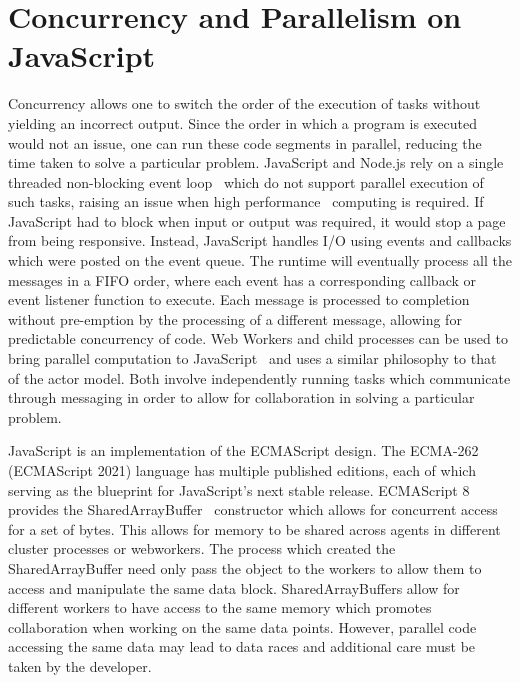 \documentclass[12pt, a4paper]{report}
\theoremstyle{definition}
\theoremstyle{definition}%
\theoremstyle{definition}%
\theoremstyle{definition}%
\theoremstyle{definition}%
\theoremstyle{definition}%
\begin{document}
\section{Concurrency and Parallelism on JavaScript}
Concurrency allows one to switch the order of the execution of tasks without yielding an incorrect output. Since the order in which a program is executed would not an issue, one can run these code segments in parallel, reducing the time taken to solve a particular problem. JavaScript and Node.js rely on a single threaded non-blocking event loop~\cite{eventloopbrowser}\cite{eventloopnode} which do not support parallel execution of such tasks, raising an issue when high performance~\cite{highperformance} computing is required. If JavaScript had to block when input or output was required, it would stop a page from being responsive. Instead, JavaScript handles I/O using events and callbacks which were posted on the event queue. The runtime will eventually process all the messages in a FIFO order, where each event has a corresponding callback or event listener function to execute. Each message is processed to completion without pre-emption by the processing of a different message, allowing for predictable concurrency of code. Web Workers\cite{webworkers} and child processes\cite{cluster} can be used to bring parallel computation to JavaScript~\cite{concurrencyjs}\cite{spidersjs} and uses a similar philosophy to that of the actor model. Both involve independently running tasks which communicate through messaging in order to allow for collaboration in solving a particular problem.

JavaScript is an implementation of the ECMAScript design. The ECMA-262 (ECMAScript 2021) language has multiple published editions, each of which serving as the blueprint for JavaScript’s next stable release. ECMAScript 8 provides the SharedArrayBuffer~\cite{es8}\cite{sharedarraybuffer} constructor which allows for concurrent access for a set of bytes. This allows for memory to be shared across agents in different cluster processes or webworkers. The process which created the SharedArrayBuffer need only pass the object to the workers to allow them to access and manipulate the same data block. SharedArrayBuffers allow for different workers to have access to the same memory which promotes collaboration when working on the same data points. However, parallel code accessing the same data may lead to data races and additional care must be taken by the developer.
\end{document}
